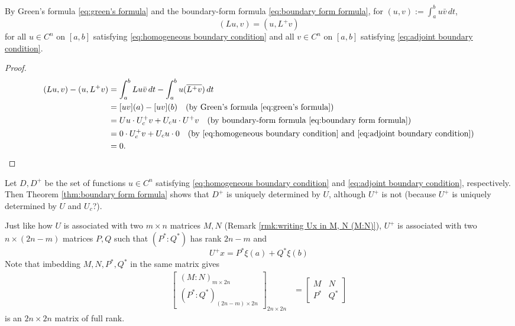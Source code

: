 \documentclass[10.5pt, oneside, a4paper]{article}
\begin{document}
\begin{prop}\label{prop:(Lu,v)=(u,L^+v)}
    By Green's formula \eqref{eq:green's formula} and the boundary-form formula \eqref{eq:boundary form formula}, for $(u,v):=\int_a^b u\bar{v}\,dt$, 
    \[(Lu, v) = (u, L^+v)\]
    for all $u\in C^n$ on $[a,b]$ satisfying \eqref{eq:homogeneous boundary condition} and all $v\in C^n$ on $[a,b]$ satisfying \eqref{eq:adjoint boundary condition}.
\end{prop}
{\color{blue}
\begin{proof}
    \begin{equation}
        \begin{split}
            (Lu, v) - (u, L^+v) &= \int_a^b Lu\bar{v}\,dt - \int_a^b u(\overline{L^+v})\,dt\\
            &= [uv](a) - [uv](b) \quad\mbox{(by Green's formula \eqref{eq:green's formula})}\\
            &= Uu\cdot U_c^+ v + U_c u\cdot U^+v \quad\mbox{(by boundary-form formula \eqref{eq:boundary form formula})}\\
            &= 0\cdot U_c^+ v + U_c u \cdot 0 \quad\mbox{(by \eqref{eq:homogeneous boundary condition} and \eqref{eq:adjoint boundary condition})}\\
            &= 0.
        \end{split}
    \end{equation}
\end{proof}
}
\begin{rmk}
    Let $D, D^+$ be the set of functions $u\in C^n$ satisfying \eqref{eq:homogeneous boundary condition} and \eqref{eq:adjoint boundary condition}, respectively. Then Theorem \ref{thm:boundary form formula} shows that $D^+$ is uniquely determined by $U$, although $U^+$ is not {\color{blue}(because $U^+$ is uniquely determined by $U$ and $U_c$?)}.
\end{rmk}

{\color{blue}
Just like how $U$ is associated with two $m\times n$ matrices $M, N$ (Remark \ref{rmk:writing Ux in M, N (M:N)}), $U^+$ is associated with two $n\times (2n-m)$ matrices $P, Q$ such that $(P^*:Q^*)$ has rank $2n-m$ and
\begin{equation}\label{eq:U^+x in P* Q*}
    U^+x = P^*\xi(a) + Q^*\xi(b)
\end{equation}
Note that imbedding $M, N, P^*, Q^*$ in the same matrix gives
\begin{align*}
    \begin{bmatrix}
        (M:N)_{m\times 2n}\\
        (P^*:Q^*)_{(2n-m)\times 2n}
    \end{bmatrix}_{2n\times 2n} & = \begin{bmatrix}
        M & N\\
        P^* & Q^*
    \end{bmatrix}
\end{align*}
is an $2n\times 2n$ matrix of full rank.
}
\end{document}
